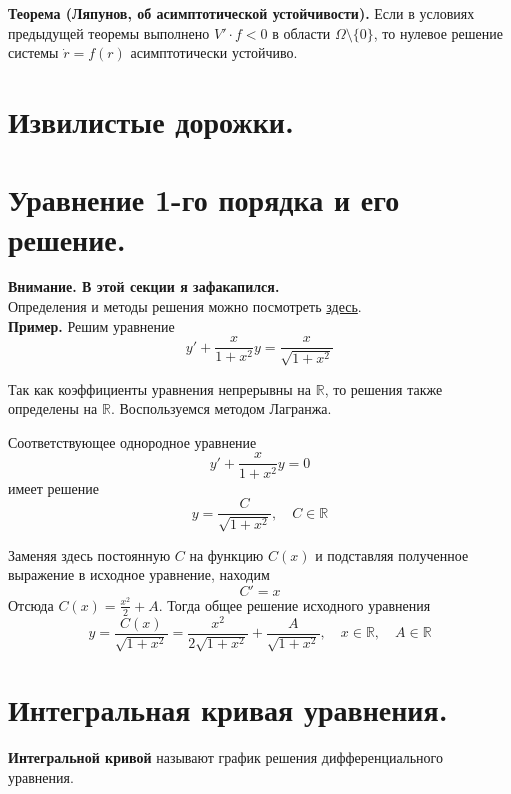 \documentclass{article}
\begin{document}
\noindent \textbf{Теорема (Ляпунов, об асимптотической устойчивости).} Если в условиях предыдущей теоремы выполнено $V' \cdot f < 0$ в области $\Omega \setminus \{0\}$, то нулевое решение системы $\dot{r} = f(r)$ асимптотически устойчиво.

\section{Извилистые дорожки.}

{}
\section*{Уравнение 1-го порядка и его решение.}
\textbf{Внимание. В этой секции я зафакапился.}\\
Определения и методы решения можно посмотреть \hyperref[bil2]{здесь}.\\

\noindent \textbf{Пример.} Решим уравнение
\begin{equation*}
    y' + \frac{x}{1+x^2}y = \frac{x}{\sqrt{1 + x^2}}
\end{equation*}

Так как коэффициенты уравнения непрерывны на $\mathbb{R}$, то решения также определены на $\mathbb{R}$. Воспользуемся методом Лагранжа.

Соответствующее однородное уравнение
\begin{equation*}
    y' + \frac{x}{1+x^2}y = 0
\end{equation*}
имеет решение
\begin{equation*}
    y = \frac{C}{\sqrt{1 + x^2}}, \quad C \in \mathbb{R}
\end{equation*}

Заменяя здесь постоянную $C$ на функцию $C(x)$ и подставляя полученное выражение в исходное уравнение, находим
\begin{equation*}
    C' = x
\end{equation*}
Отсюда $C(x) = \frac{x^2}{2} + A$. Тогда общее решение исходного уравнения
\begin{equation*}
    y = \frac{C(x)}{\sqrt{1 + x^2}} =  \frac{x^2}{2\sqrt{1 + x^2}} + \frac{A}{\sqrt{1 + x^2}}, \quad x \in \mathbb{R}, \quad A \in \mathbb{R}
\end{equation*}

{}
\section*{Интегральная кривая уравнения.}
\textbf{Интегральной кривой} называют график решения дифференциального уравнения.
\end{document}
